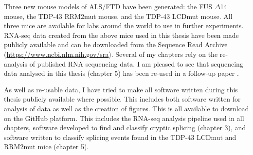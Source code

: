 Three new mouse models of ALS/FTD have been generated: the FUS $\Delta$14 mouse, the TDP-43 RRM2mut mouse, and the TDP-43 LCDmut mouse. 
All three mice are available for labs around the world to use in further experiments.
RNA-seq data created from the above mice used in this thesis have been made publicly available and can be downloaded from the Sequence Read Archive (\url{https://www.ncbi.nlm.nih.gov/sra}).
Several of my chapters rely on the re-analysis of published RNA sequencing data. 
I am pleased to see that sequencing data analysed in this thesis (chapter 5) has been re-used in a follow-up paper \citep{Sivakumar2018}.
 
 As well as re-usable data, I have tried to make all software written during this thesis publicly available where possible.
 This includes both software written for analysis of data as well as the creation of figures.
This is all available to download on the GitHub platform. 
 This includes the RNA-seq analysis pipeline used in all chapters\footnotemark , software developed to find and classify cryptic splicing (chapter 3)\footnotemark, and software written to classify splicing events found in the TDP-43 LCDmut and RRM2mut mice (chapter 5)\footnotemark.



\cleardoublepage

\tableofcontents %
\listoffigures %
\listoftables %

